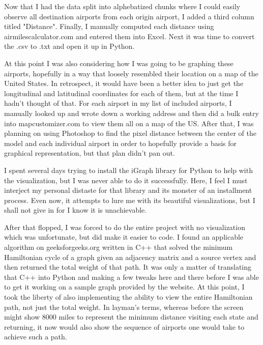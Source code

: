 \documentclass[12pt]{article}
\begin{document}
Now that I had the data split into alphebatized chunks where
I could easily observe all destination airports from each origin airport,
I added a third column titled "Distance". Finally, I manually computed 
each distance using airmilescalculator.com and entered them into Excel. 
Next it was time to convert the .csv to .txt and open it up in Python.

At this point I was also considering how I was going to be graphing these
airports, hopefully in a way that loosely resembled their location on 
a map of the United States. In retrospect, it would have been a better idea
to just get the longitudinal and latitudinal coordinates for each of them,
but at the time I hadn't thought of that. For each airport in my list of
included airports, I manually looked up and wrote down a working address
and then did a bulk entry into mapcustomizer.com to view them all on a 
map of the US. After that, I was planning on using Photoshop to find the
pixel distance between the center of the model and each individual airport
in order to hopefully provide a basis for graphical representation,
but that plan didn't pan out.

I spent several days trying to install the iGraph library for Python to
help with the visualization, but I was never able to do it successfully.
Here, I feel I must interject
my personal distaste for that library and its monster of an installment 
process. Even now, it attempts to lure me with its beautiful visualizations,
but I shall not give in for I know it is unachievable. 

After that flopped, I was forced to do the entire project with no visualization
which was unfortunate, but did make it easier to code. I found an applicable
algorithm on geeksforgeeks.org written in C++ that solved the minimum Hamiltonian
cycle of a graph given an adjacency matrix and a source vertex and then returned
the total weight of that path. It was only a matter of translating that 
C++ into Python and making a few tweaks here and there before I was able to get
it working on a sample graph provided by the website. At this point, I took
the liberty of also implementing the ability to view the entire Hamiltonian path,
not just the total weight. In layman's terms, whereas before the screen might
show 8000 miles to represent the minimum distance visiting each state and returning,
it now would also show the sequence of airports one would take to achieve such a path.

\pagebreak
\end{document}
